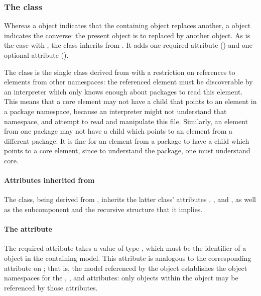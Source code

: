\subsubsection{The \ReplacedBy class}
\label{replacedby-class}

Whereas a \ReplacedElement object indicates that the containing object
replaces another, a \ReplacedBy object indicates the converse: the
present object is to replaced by another object.  As is the case with
\ReplacedElement, the \ReplacedBy class inherits from \SBaseRef.  It
adds one required attribute () and one optional
attribute ().

The \ReplacedBy class is the single class derived from \SBaseRef with a
restriction on references to elements from other namespaces:  the referenced
element must be discoverable by an interpreter which only knows enough about
packages to read this element.  This means that a core element may not have
a \ReplacedBy child that points to an element in a package namespace, because
an interpreter might not understand that namespace, and attempt to read
and manipulate this file.  Similarly, an element from one package may not
have a \ReplacedBy child which points to an element from a different
package.  It is fine for an element from a package to have a \ReplacedBy
child which points to a core element, since to understand the package, one 
must understand core.


\paragraph{Attributes inherited from }

The \ReplacedBy class, being derived from \SBaseRef, inherits the latter
class' attributes , ,  and
, as well as the subcomponent  and the
recursive structure that it implies.  


\paragraph{The \fixttspace{} attribute}
\label{replacedby-submodelref}

The required attribute  takes a value of type
, which must be the identifier of a \Submodel object in
the containing model.  This attribute is analogous to the corresponding
attribute on \ReplacedElement; that is, the model referenced by the
\Submodel object establishes the object namespaces for the
, ,  and 
attributes: only objects within the \Model object may be referenced by
those attributes.


